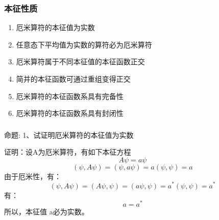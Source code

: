 \begin{frame}
    \frametitle{本征性质}
    \begin{enumerate}
        \item 厄米算符的本征值为实数
        \item 任意态下平均值为实数的算符必为厄米算符
        \item 厄米算符属于不同本征值的本征函数正交
        \item 简并的本征函数可通过重组变得正交
        \item 厄米算符的本征函数系具有完备性
        \item 厄米算符的本征函数系具有封闭性
    \end{enumerate}
\end{frame} 
\begin{frame} [allowframebreaks=]
    \frametitle{}
    \begin{tcolorbox1}{命题:}
        1、试证明厄米算符的本征值为实数
    \end{tcolorbox1}
    \alert{证明：}设A为厄米算符，有如下本征方程
    $$A\psi=a\psi $$
    \begin{equation*}
        (\psi, A\psi)=(\psi, a\psi)=a(\psi, \psi)=a
    \end{equation*}  
    由于厄米性，有：
    \begin{equation*}
        (\psi, A\psi)=(A\psi, \psi)=(a\psi, \psi)= a^* (\psi, \psi)=a^*
    \end{equation*}
    有：
    \begin{equation*}
        a= a^* 
    \end{equation*}
    所以，本征值 a必为实数。
\end{frame} 

